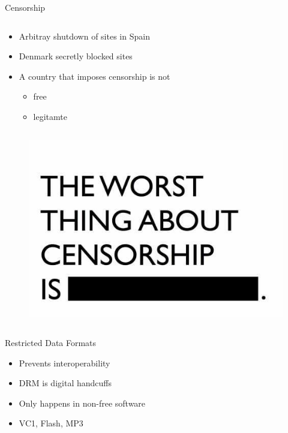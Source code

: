 \begin{frame}{Censorship}
  \begin{column}{0.45\textwidth}
    \begin{itemize}
      \item Arbitray shutdown of sites in Spain
      \item Denmark secretly blocked sites
      \item A country that imposes censorship is not
        \begin{itemize}
          \item free
          \item legitamte
        \end{itemize}
    \end{itemize}
  \end{column}
  \begin{column}{0.5\textwidth}\raggedleft{}
    \begin{figure}
      \includegraphics[width=\textwidth]{images/censorship.jpg}
    \end{figure}
  \end{column}
\end{frame}

\begin{frame}{Restricted Data Formats}
  \begin{itemize}
    \item Prevents interoperability
    \item DRM is digital handcuffs
    \item Only happens in non-free software
    \item VC1, Flash, MP3
  \end{itemize}
\end{frame}

